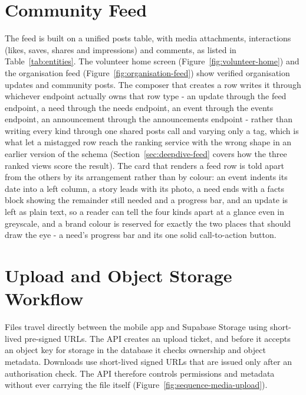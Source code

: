 \section{Community Feed}
\label{sec:impl-feed}
The feed is built on a unified posts table, with media attachments, interactions (likes, saves, shares and impressions) and comments, as listed in Table~\ref{tab:entities}. The volunteer home screen (Figure~\ref{fig:volunteer-home}) and the organisation feed (Figure~\ref{fig:organisation-feed}) show verified organisation updates and community posts. The composer that creates a row writes it through whichever endpoint actually owns that row type - an update through the feed endpoint, a need through the needs endpoint, an event through the events endpoint, an announcement through the announcements endpoint - rather than writing every kind through one shared posts call and varying only a tag, which is what let a mistagged row reach the ranking service with the wrong shape in an earlier version of the schema (Section~\ref{sec:deepdive-feed} covers how the three ranked views score the result). The card that renders a feed row is told apart from the others by its arrangement rather than by colour: an event indents its date into a left column, a story leads with its photo, a need ends with a facts block showing the remainder still needed and a progress bar, and an update is left as plain text, so a reader can tell the four kinds apart at a glance even in greyscale, and a brand colour is reserved for exactly the two places that should draw the eye - a need's progress bar and its one solid call-to-action button.

\section{Upload and Object Storage Workflow}
\label{sec:impl-uploads}


Files travel directly between the mobile app and Supabase Storage using short-lived pre-signed URLs. The API creates an upload ticket, and before it accepts an object key for storage in the database it checks ownership and object metadata. Downloads use short-lived signed URLs that are issued only after an authorisation check. The API therefore controls permissions and metadata without ever carrying the file itself (Figure~\ref{fig:sequence-media-upload}).


